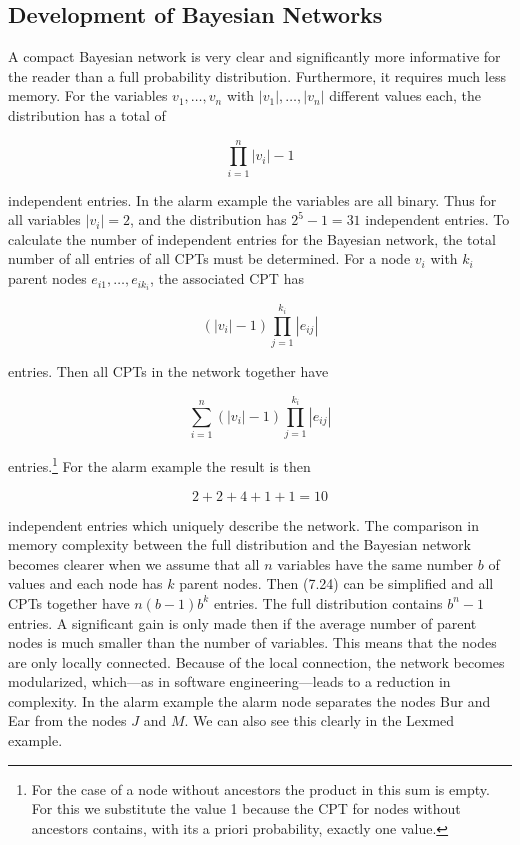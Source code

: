 \documentclass[10pt]{book}
\begin{document}
\subsection{Development of Bayesian Networks}
A compact Bayesian network is very clear and significantly more informative for the reader than a full probability distribution. Furthermore, it requires much less memory. For the variables $v_{1}, \ldots, v_{n}$ with $\left|v_{1}\right|, \ldots,\left|v_{n}\right|$ different values each, the distribution has a total of

$$
\prod_{i=1}^{n}\left|v_{i}\right|-1
$$

independent entries. In the alarm example the variables are all binary. Thus for all variables $\left|v_{i}\right|=2$, and the distribution has $2^{5}-1=31$ independent entries. To calculate the number of independent entries for the Bayesian network, the total number of all entries of all CPTs must be determined. For a node $v_{i}$ with $k_{i}$ parent nodes $e_{i 1}, \ldots, e_{i k_{i}}$, the associated CPT has

$$
\left(\left|v_{i}\right|-1\right) \prod_{j=1}^{k_{i}}\left|e_{i j}\right|
$$

entries. Then all CPTs in the network together have

\begin{equation*}
\sum_{i=1}^{n}\left(\left|v_{i}\right|-1\right) \prod_{j=1}^{k_{i}}\left|e_{i j}\right| \tag{7.24}
\end{equation*}

entries.\footnote{For the case of a node without ancestors the product in this sum is empty. For this we substitute the value 1 because the CPT for nodes without ancestors contains, with its a priori probability, exactly one value.} For the alarm example the result is then

$$
2+2+4+1+1=10
$$

independent entries which uniquely describe the network. The comparison in memory complexity between the full distribution and the Bayesian network becomes clearer when we assume that all $n$ variables have the same number $b$ of values and each node has $k$ parent nodes. Then (7.24) can be simplified and all CPTs together have $n(b-1) b^{k}$ entries. The full distribution contains $b^{n}-1$ entries. A significant gain is only made then if the average number of parent nodes is much smaller than the number of variables. This means that the nodes are only locally connected. Because of the local connection, the network becomes modularized, which—as in software engineering—leads to a reduction in complexity. In the alarm example the alarm node separates the nodes Bur and Ear from the nodes $J$ and $M$. We can also see this clearly in the Lexmed example.
\end{document}

